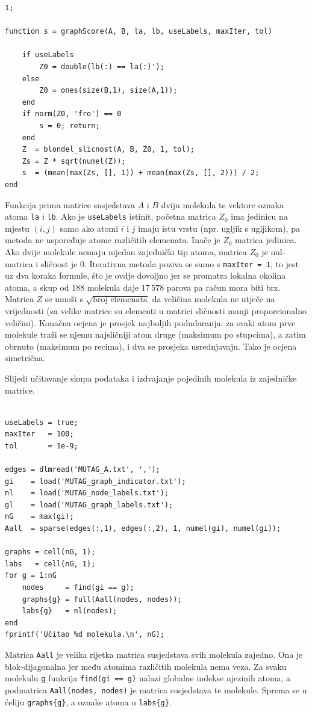 \documentclass[12pt, letterpaper]{article}
\numberwithin{figure}{section}
\begin{document}
\begin{lstlisting}[style=octave, caption={Mjera sličnosti dviju molekula}, label={lst:mutag_score}]
1;

function s = graphScore(A, B, la, lb, useLabels, maxIter, tol)

    if useLabels
        Z0 = double(lb(:) == la(:)');         
    else
        Z0 = ones(size(B,1), size(A,1));
    end
    if norm(Z0, 'fro') == 0
        s = 0; return;                          
    end
    Z  = blondel_slicnost(A, B, Z0, 1, tol);
    Zs = Z * sqrt(numel(Z));                    
    s  = (mean(max(Zs, [], 1)) + mean(max(Zs, [], 2))) / 2;  
end
\end{lstlisting}
Funkcija prima matrice susjedstava $A$ i $B$ dviju molekula te vektore oznaka atoma \texttt{la} i \texttt{lb}. Ako je \texttt{useLabels} istinit, početna matrica $Z_0$ ima jedinicu na mjestu $(i,j)$ samo ako atomi $i$ i $j$ imaju istu vrstu (npr. ugljik s ugljikom), pa metoda ne uspoređuje atome različitih elemenata. Inače je $Z_0$ matrica jedinica. Ako dvije molekule nemaju nijedan zajednički tip atoma, matrica $Z_0$ je nul-matrica i sličnost je $0$. Iterativna metoda poziva se samo s \texttt{maxIter = 1}, to jest uz dva koraka formule, što je ovdje dovoljno jer se promatra lokalna okolina atoma, a skup od $188$ molekula daje $17\,578$ parova pa račun mora biti brz. Matrica $Z$ se množi s $\sqrt{\text{broj elemenata}}$ da veličina molekula ne utječe na vrijednosti (za velike matrice su elementi u matrici sličnosti manji proporcionalno veličini). Konačna ocjena je prosjek najboljih podudaranja: za svaki atom prve molekule traži se njemu najsličniji atom druge (maksimum po stupcima), a zatim obrnuto (maksimum po recima), i dva se prosjeka usrednjavaju. Tako je ocjena simetrična.

Slijedi učitavanje skupa podataka i izdvajanje pojedinih molekula iz zajedničke matrice.

\begin{lstlisting}[style=octave, caption={Učitavanje skupa MUTAG}, label={lst:mutag_ucitavanje}]

useLabels = true;
maxIter   = 100;
tol       = 1e-9;

edges = dlmread('MUTAG_A.txt', ',');            
gi    = load('MUTAG_graph_indicator.txt');      
nl    = load('MUTAG_node_labels.txt');          
gl    = load('MUTAG_graph_labels.txt');    
nG    = max(gi);
Aall  = sparse(edges(:,1), edges(:,2), 1, numel(gi), numel(gi));

graphs = cell(nG, 1);
labs   = cell(nG, 1);
for g = 1:nG
    nodes     = find(gi == g);
    graphs{g} = full(Aall(nodes, nodes));
    labs{g}   = nl(nodes);
end
fprintf('Učitao %d molekula.\n', nG);
\end{lstlisting}
Matrica \texttt{Aall} je velika rijetka matrica susjedstava svih molekula zajedno. Ona je blok-dijagonalna jer među atomima različitih molekula nema veza. Za svaku molekulu \texttt{g} funkcija \texttt{find(gi == g)} nalazi globalne indekse njezinih atoma, a podmatrica \texttt{Aall(nodes, nodes)} je matrica susjedstava te molekule. Sprema se u ćeliju \texttt{graphs\{g\}}, a oznake atoma u \texttt{labs\{g\}}.
\end{document}
